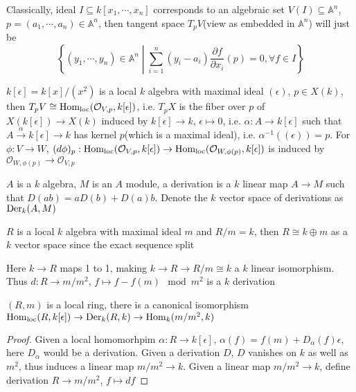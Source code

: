 \documentclass[main]{subfiles}
\begin{document}
Classically, ideal $I\subseteq k[x_1,\cdots,x_n]$ corresponds to an algebraic set $V(I)\subseteq\mathbb A^n$, $p=(a_1,\cdots,a_n)\in\mathbb A^n$, then tangent space $T_pV$(view as embedded in $\mathbb A^n$) will just be
\[\left\{(y_1,\cdots,y_n)\in\mathbb A^n\middle|\sum_{i=1}^n(y_i-a_i)\frac{\partial f}{\partial x_i}(p)=0,\forall f\in I\right\}\]

\begin{definition}
$k[\epsilon]=k[x]/(x^2)$ is a local $k$ algebra with maximal ideal $(\epsilon)$, $p\in X(k)$, then $T_pV\cong\operatorname{Hom}_{\operatorname{loc}}(\mathcal O_{V,p},k[\epsilon])$, i.e. $T_pX$ is the fiber over $p$ of $X(k[\epsilon])\to X(k)$ induced by $k[\epsilon]\to k$, $\epsilon\mapsto0$, i.e. $\alpha:A\to k[\epsilon]$ such that $A\xrightarrow\alpha k[\epsilon]\to k$ has kernel $p$(which is a maximal ideal), i.e. $\alpha^{-1}((\epsilon))=p$. For $\phi: V\to W$, $(d\phi)_p:\operatorname{Hom}_{\operatorname{loc}}(\mathcal O_{V,p},k[\epsilon])\to\operatorname{Hom}_{\operatorname{loc}}(\mathcal O_{W,\phi(p)},k[\epsilon])$ is induced by $\mathcal O_{W,\phi(p)}\to\mathcal O_{V,p}$
\end{definition}

\begin{definition}
$A$ is a $k$ algebra, $M$ is an $A$ module, a derivation is a $k$ linear map $A\to M$ such that $D(ab)=aD(b)+D(a)b$. Denote the $k$ vector space of derivations as $\operatorname{Der}_k(A,M)$
\end{definition}

\begin{example}
$R$ is a local $k$ algebra with maximal ideal $m$ and $R/m=k$, then $R\cong k\oplus m$ as a $k$ vector space since the exact sequence split
\begin{center}
\end{center}
Here $k\to R$ maps 1 to 1, making $k\to R\to R/m\cong k$ a $k$ linear isomorphism. Thus $d:R\to m/m^2$, $f\mapsto f-f(m)\mod m^2$ is a $k$ derivation
\end{example}

\begin{proposition}
$(R,m)$ is a local ring, there is a canonical isomorphism $\operatorname{Hom}_{\operatorname{loc}}(R,k[\epsilon])\to\operatorname{Der}_k(R,k)\to\operatorname{Hom}_k(m/m^2,k)$
\end{proposition}

\begin{proof}
Given a local homomorhpim $\alpha:R\to k[\epsilon]$, $\alpha(f)=f(m)+D_\alpha(f)\epsilon$, here $D_\alpha$ would be a derivation. Given a derivation $D$, $D$ vanishes on $k$ as well as $m^2$, thus induces a linear map $m/m^2\to k$. Given a linear map $m/m^2\to k$, define derivation $R\to m/m^2$, $f\mapsto df$
\end{proof}
\end{document}

